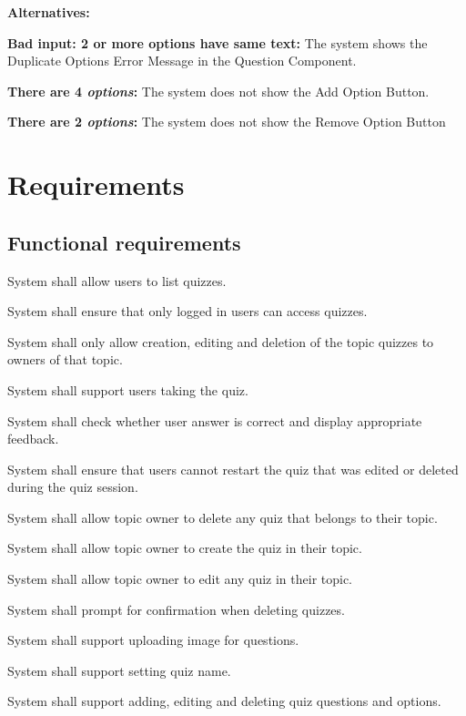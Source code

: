 \documentclass[
    english, %
]{VUMIFPSkursinis}
\begin{document}
\noindent\textbf{\fontsize{13}{15}\selectfont Alternatives:}

\textbf{Bad input: 2 or more options have same text:} The system shows the Duplicate Options Error Message in the Question Component.

\textbf{There are 4 \textit{options}:} The system does not show the Add Option Button.

\textbf{There are 2 \textit{options}:} The system does not show the Remove Option Button

\section{Requirements}

\subsection{Functional requirements}


\begin{frlist}
    \item System shall allow users to list quizzes.
    \item System shall ensure that only logged in users can access quizzes.
    \item System shall only allow creation, editing and deletion of the topic quizzes to owners of that topic.
    \item System shall support users taking the quiz.
    \item System shall check whether user answer is correct and display appropriate feedback.
    \item System shall ensure that users cannot restart the quiz that was edited or deleted during the quiz session.
    \item System shall allow topic owner to delete any quiz that belongs to their topic.
    \item System shall allow topic owner to create the quiz in their topic.
    \item System shall allow topic owner to edit any quiz in their topic.
    \item System shall prompt for confirmation when deleting quizzes.
    \item System shall support uploading image for questions.
    \item System shall support setting quiz name.
    \item System shall support adding, editing and deleting quiz questions and options.
\end{frlist}
\end{document}
